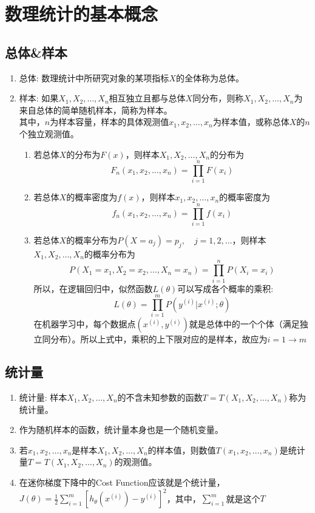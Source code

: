\section{数理统计的基本概念}
\subsection{总体\&样本}
\begin{enumerate}
	\item 总体: 数理统计中所研究对象的某项指标$X$的全体称为总体。
	\item 样本: 如果$X_1, X_2, \dots, X_n$相互独立且都与总体$X$同分布，则称$X_1, X_2, \dots, X_n$为来自总体的简单随机样本，简称为样本。\\
	其中，$n$为样本容量，样本的具体观测值$x_1, x_2, \dots, x_n$为样本值，或称总体$X$的$n$个独立观测值。
	\begin{enumerate}
		\item 若总体$X$的分布为$F(x)$，则样本$X_1, X_2, \dots, X_n$的分布为
		\begin{equation}
			F_n(x_1, x_2, \dots, x_n) = \prod_{i=1}^{n}F(x_i)
		\end{equation}

		\item 若总体$X$的概率密度为$f(x)$，则样本$x_1, x_2, \dots, x_n$的概率密度为
		\begin{equation}
			f_n(x_1, x_2, \dots, x_n) = \prod_{i=1}^{n}f(x_i)
		\end{equation}
		\item 若总体$X$的概率分布为$P(X=a_j)=p_j, \quad j = 1,2, \dots$，则样本$X_1, X_2, \dots, X_n$的概率分布为
		\begin{equation}
			P(X_1=x_1, X_2=x_2, \dots, X_n=x_n) = \prod_{i=1}^{n}P(X_i = x_i)
		\end{equation}
		所以，在逻辑回归中，似然函数$L(\theta)$可以写成各个概率的乘积:
		\begin{equation}
			L(\theta)=\prod_{i=1}^{m}P(y^{(i)}|x^{(i)}; \theta)
		\end{equation}
		在机器学习中，每个数据点$(x^{(i)},y^{(i)})$就是总体中的一个个体（满足独立同分布）。所以上式中，乘积的上下限对应的是样本，故应为$i=1 \to m$
	\end{enumerate}
\end{enumerate}

\subsection{统计量}
\begin{enumerate}
	\item 统计量: 样本$X_1, X_2, \dots, X_n$的不含未知参数的函数$T = T(X_1, X_2, \dots, X_n)$称为统计量。
	\item 作为随机样本的函数，统计量本身也是一个随机变量。
	\item 若$x_1, x_2, \dots, x_n$是样本$X_1, X_2, \dots, X_n$的样本值，则数值$T(x_1, x_2, \dots, x_n)$是统计量$T = T(X_1, X_2, \dots, X_n)$的观测值。
	\item 在迷你梯度下降中的Cost Function应该就是个统计量，$J(\theta)=\frac{1}{2}\sum_{i=1}^{m}\left[h_\theta(x^{(i)}) - y^{(i)}\right]^2$，其中，$\sum_{i=1}^{m}$就是这个$T${\color{red}{（正确性待查）}}
\end{enumerate}


